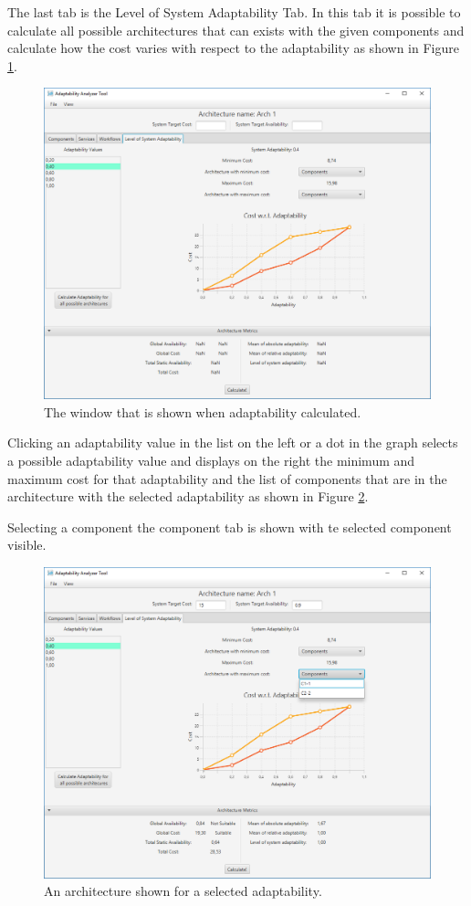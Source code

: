 The last tab is the Level of System Adaptability Tab. In this tab it is possible to calculate all possible architectures that can exists with the given components and calculate how the cost varies with respect to the adaptability as shown in Figure \ref{fig:adapt-wrt-avail}. 

\begin{figure}[!ht]
	\centerline
	{\includegraphics[scale=0.50]{img/adapt_wrt_avail.png}}
	\caption[Availability Window]{The window that is shown when adaptability calculated.}
	\label{fig:adapt-wrt-avail}
\end{figure}

Clicking an adaptability value in the list on the left or a dot in the graph selects a possible adaptability value and displays on the right the minimum and maximum cost for that adaptability and the list of components that are in the architecture with the selected adaptability as shown in Figure \ref{fig:adapt-wrt-avail-comp}. 

Selecting a component the component tab is shown with te selected component visible.

\begin{figure}[!ht]
	\centerline
	{\includegraphics[scale=0.50]{img/adapt_wrt_avail_comp.png}}
	\caption[Availability Window with Architecture]{An architecture shown for a selected adaptability.}
	\label{fig:adapt-wrt-avail-comp}
\end{figure}